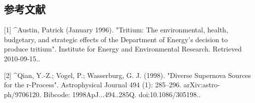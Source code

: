 \subsection{参考文献}
[1]
^Austin, Patrick (January 1996). "Tritium: The environmental, health, budgetary, and strategic effects of the Department of Energy's decision to produce tritium". Institute for Energy and Environmental Research. Retrieved 2010-09-15..

[2]
^Qian, Y.-Z.; Vogel, P.; Wasserburg, G. J. (1998). "Diverse Supernova Sources for the r-Process". Astrophysical Journal 494 (1): 285–296. arXiv:astro-ph/9706120. Bibcode: 1998ApJ...494..285Q. doi:10.1086/305198..